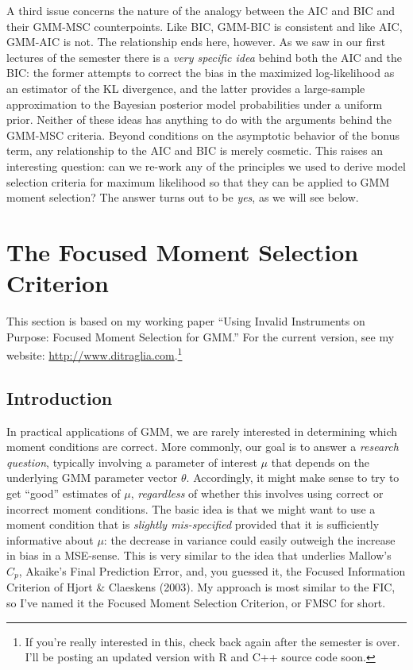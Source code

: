 A third issue concerns the nature of the analogy between the AIC and BIC and their GMM-MSC counterpoints. Like BIC, GMM-BIC is consistent and like AIC, GMM-AIC is not. The relationship ends here, however. As we saw in our first lectures of the semester there is a \emph{very specific idea} behind both the AIC and the BIC: the former attempts to correct the bias in the maximized log-likelihood as an estimator of the KL divergence, and the latter provides a large-sample approximation to the Bayesian posterior model probabilities under a uniform prior. Neither of these ideas has anything to do with the arguments behind the GMM-MSC criteria. Beyond conditions on the asymptotic behavior of the bonus term, any relationship to the AIC and BIC is merely cosmetic. This raises an interesting question: can we re-work any of the principles we used to derive model selection criteria for maximum likelihood so that they can be applied to GMM moment selection? The answer turns out to be \emph{yes}, as we will see below.



\section{The Focused Moment Selection Criterion}
This section is based on my working paper ``Using Invalid Instruments on Purpose: Focused Moment Selection for GMM.'' For the current version, see my website: \url{http://www.ditraglia.com}.\footnote{If you're really interested in this, check back again after the semester is over. I'll be posting an updated version with R and C++ source code soon.}

\subsection{Introduction}
In practical applications of GMM, we are rarely interested in determining which moment conditions are correct. More commonly, our goal is to answer a \emph{research question}, typically involving a parameter of interest $\mu$ that depends on the underlying GMM parameter vector $\theta$. Accordingly, it might make sense to try to get ``good'' estimates of $\mu$, \emph{regardless} of whether this involves using correct or incorrect moment conditions. The basic idea is that we might want to use a moment condition that is \emph{slightly mis-specified} provided that it is sufficiently informative about $\mu$: the decrease in variance could easily outweigh the increase in bias in a MSE-sense. This is very similar to the idea that underlies Mallow's $C_p$, Akaike's Final Prediction Error, and, you guessed it, the Focused Information Criterion of Hjort \& Claeskens (2003). My approach is most similar to the FIC, so I've named it the Focused Moment Selection Criterion, or FMSC for short. 

